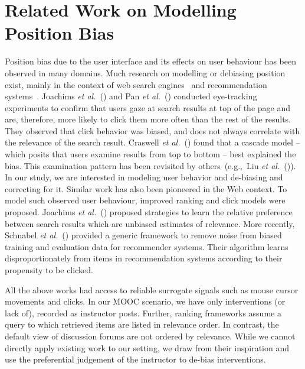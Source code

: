 \documentclass[11pt,a4paper]{article}
\begin{document}
\section{Related Work on Modelling Position Bias}

Position bias due to the user interface and its effects on user
behaviour has been observed in many domains.  Much research on
modelling or debiasing position exist, mainly in the context of web
search
engines~\cite{joachims2005,pan2007google,craswell2008,wang2016,Joachims2016a}
and recommendation systems~\cite{schnabel2016,liang2016}. Joachims
{\it et al.}~(\citeyear{joachims2005}) and 
Pan {\it et al.}~(\citeyear{pan2007google}) conducted eye-tracking
experiments to confirm that users gaze at search results at top of the
page and are, therefore, more likely to click them more often than 
the rest of the results. They observed that click behavior was 
biased, and does not always correlate with the relevance of the 
search result. 
Craswell {\it et al.}~(\citeyear{craswell2008}) 
found that a cascade model -- which posits that users examine results 
from top to bottom -- best explained the bias. This examination 
pattern has been revisited by others~(e.g.,~Liu {\it et al.}~(\citeyear{liu2014skimming})).
In our study, we are interested in modeling user behavior and
de-biasing and correcting for it.  Similar work has also been
pioneered in the Web context. To model such observed user behaviour,
improved ranking and click models were proposed. Joachims {\it et
  al.}~(\citeyear{joachims2005}) proposed strategies to learn the relative
preference between search results which are unbiased estimates of
relevance. More recently, Schnabel {\it et al.}~(\citeyear{schnabel2016})
provided a generic framework to remove noise from biased training and
evaluation data for recommender systems. Their algorithm learns
disproportionately from items in recommendation systems according to
their propensity to be clicked.

All the above works had access to reliable surrogate signals such as
mouse cursor movements and clicks. In our MOOC scenario, we have 
only interventions (or lack of), recorded as instructor posts.
Further, ranking frameworks assume a query to which retrieved items 
are listed in relevance order. In contrast, the default view of 
discussion forums are not ordered by relevance. While we cannot 
directly apply existing work to our setting, we draw from their 
inspiration and use the preferential judgement of the instructor to 
de-bias interventions.
\end{document}
